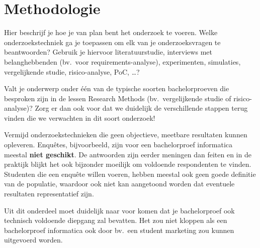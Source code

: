 


\section{Methodologie}%
\label{sec:methodologie}

Hier beschrijf je hoe je van plan bent het onderzoek te voeren. Welke onderzoekstechniek ga je toepassen om elk van je onderzoeksvragen te beantwoorden? Gebruik je hiervoor literatuurstudie, interviews met belanghebbenden (bv.~voor requirements-analyse), experimenten, simulaties, vergelijkende studie, risico-analyse, PoC, \ldots?

Valt je onderwerp onder één van de typische soorten bachelorproeven die besproken zijn in de lessen Research Methods (bv.\ vergelijkende studie of risico-analyse)? Zorg er dan ook voor dat we duidelijk de verschillende stappen terug vinden die we verwachten in dit soort onderzoek!

Vermijd onderzoekstechnieken die geen objectieve, meetbare resultaten kunnen opleveren. Enquêtes, bijvoorbeeld, zijn voor een bachelorproef informatica meestal \textbf{niet geschikt}. De antwoorden zijn eerder meningen dan feiten en in de praktijk blijkt het ook bijzonder moeilijk om voldoende respondenten te vinden. Studenten die een enquête willen voeren, hebben meestal ook geen goede definitie van de populatie, waardoor ook niet kan aangetoond worden dat eventuele resultaten representatief zijn.

Uit dit onderdeel moet duidelijk naar voor komen dat je bachelorproef ook technisch voldoen\-de diepgang zal bevatten. Het zou niet kloppen als een bachelorproef informatica ook door bv.\ een student marketing zou kunnen uitgevoerd worden.


